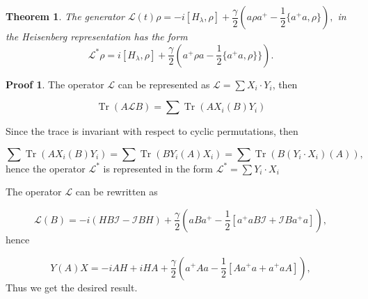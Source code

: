 \documentclass[12pt]{article}
\newtheorem{theorem}{Theorem}
\theoremstyle{definition}
\newtheorem*{demo}{Proof}
\newcommand\Tr{\operatorname{Tr}}
\def\ga {\gamma}
\def\la {\lambda}
\begin{document}
	
	
	
	
	\begin{theorem}
		\label{th:HeiGenerator}
		The generator $\mathcal{L}(t)\rho = -i[H_{\lambda},\rho] + \dfrac{\ga}{2}(a\rho a^+ - \dfrac12\{a^+a,\rho\}),$ in the Heisenberg representation has the form 
		\begin{equation*}
			\mathcal{L}^*\rho = i[H_{\la},\rho]  + \dfrac{\ga}{2}(a^+\rho a - \dfrac{1}{2}\{a^+a,\rho\}\}).
		\end{equation*}
	\end{theorem}
	
	\begin{demo}
		The operator $\mathcal{L}$ can be represented as $\mathcal{L} = \sum X_i\cdot Y_i$, then 
		
		\begin{equation*}
			\Tr(A\mathcal{L}B) = \sum\Tr(AX_i(B)Y_i)
		\end{equation*}
		
		Since the trace is invariant with respect to cyclic permutations, then 	
		
		\begin{equation*}
			\sum\Tr(AX_i(B) Y_i) = \sum\Tr(B Y_i(A)X_i) = \sum\Tr(B(Y_i\cdot X_i)(A)),
		\end{equation*}
		hence the operator $\mathcal{L}^*$ is represented in the form $\mathcal{L}^* = \sum Y_i \cdot X_i$
		
		
		The operator $\mathcal{L}$ can be rewritten as
		
		\begin{equation*}
			\mathcal{L}(B) = -i(HB\mathcal{I} - \mathcal{I}B H) + \dfrac{\ga}{2}(aB a^+ - \dfrac{1}{2}[a^+aB\mathcal{I} + \mathcal{I}B a^+a]),
		\end{equation*}
		hence
		
		\begin{equation*}
			Y(A)X = -iAH + iHA + \dfrac{\ga}{2}(a^+Aa - \dfrac{1}{2}[Aa^+a + a^+aA]),	
		\end{equation*}
		Thus we get the desired result.
	\end{demo}
	
\end{document}
